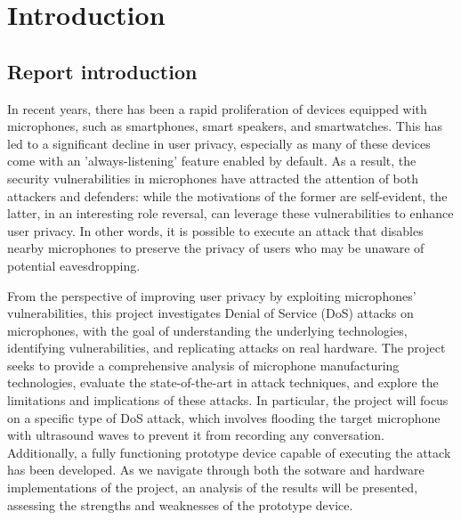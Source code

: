 \chapter{Introduction}
\section{Report introduction}
In recent years, there has been a rapid proliferation of devices equipped with microphones, such as smartphones, smart speakers, and smartwatches.
This has led to a significant decline in user privacy, especially as many of these devices come with an 'always-listening' feature enabled by default.
As a result, the security vulnerabilities in microphones have attracted the attention of both attackers and defenders: while the motivations of the former are self-evident, the latter, in an interesting role reversal, can leverage these vulnerabilities to enhance user privacy.
In other words, it is possible to execute an attack that disables nearby microphones to preserve the privacy of users who may be unaware of potential eavesdropping.

From the perspective of improving user privacy by exploiting microphones' vulnerabilities, this project investigates Denial of Service (DoS) attacks on microphones, with the goal of understanding the underlying technologies, identifying vulnerabilities, and replicating attacks on real hardware.
The project seeks to provide a comprehensive analysis of microphone manufacturing technologies, evaluate the state-of-the-art in attack techniques, and explore the limitations and implications of these attacks.
In particular, the project will focus on a specific type of DoS attack, which involves flooding the target microphone with ultrasound waves to prevent it from recording any conversation.
Additionally, a fully functioning prototype device capable of executing the attack has been developed.
As we navigate through both the sotware and hardware implementations of the project, an analysis of the results will be presented, assessing the strengths and weaknesses of the prototype device.

